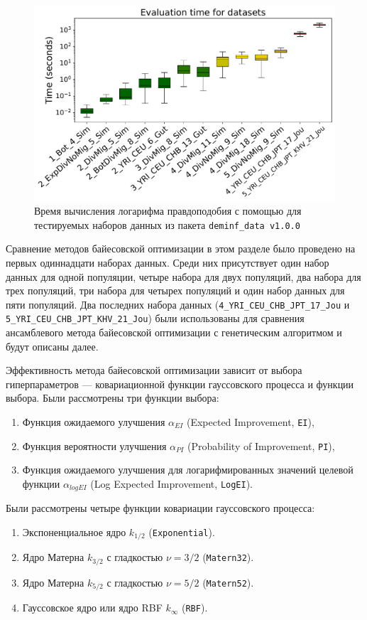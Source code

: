\begin{figure}[ht]
    \centering
    \includegraphics[width=\linewidth]{images_experiments/bo_hpo/eval_time_all_datasets.pdf}
    \caption{Время вычисления логарифма правдоподобия с помощью \moments для тестируемых наборов данных из пакета \texttt{deminf\_data v1.0.0}}
    \label{fig:part2:bo_hpo:eval_time_data_sets}
\end{figure}

Сравнение методов байесовской оптимизации в этом разделе было проведено на первых одиннадцати наборах данных.
Среди них присутствует один набор данных для одной популяции, четыре набора для двух популяций, два набора для трех популяций, три набора для четырех популяций и один набор данных для пяти популяций.
Два последних набора данных (\texttt{4\_YRI\_CEU\_CHB\_JPT\_17\_Jou} и \texttt{5\_YRI\_CEU\_CHB\_JPT\_KHV\_21\_Jou}) были использованы для сравнения ансамблевого метода байесовской оптимизации с генетическим алгоритмом и будут описаны далее.

Эффективность метода байесовской оптимизации зависит от выбора гиперпараметров --- ковариационной функции гауссовского процесса и функции выбора.
Были рассмотрены три функции выбора:
\begin{enumerate}
    \item Функция ожидаемого улучшения $\alpha_{EI}$ (Expected Improvement, \texttt{EI}),
    \item Функция вероятности улучшения $\alpha_{PI}$ (Probability of Improvement, \texttt{PI}),
    \item Функция ожидаемого улучшения для логарифмированных значений целевой функции $\alpha_{logEI}$ (Log Expected Improvement, \texttt{LogEI}).
\end{enumerate}
Были рассмотрены четыре функции ковариации гауссовского процесса:
\begin{enumerate}
    \item Экспоненциальное ядро $k_{1/2}$ (\texttt{Exponential}).
    \item Ядро Матерна $k_{3/2}$ с гладкостью $\nu=3/2$ (\texttt{Matern32}).
    \item Ядро Матерна $k_{5/2}$ с гладкостью $\nu=5/2$ (\texttt{Matern52}).
    \item Гауссовское ядро или ядро RBF $k_{\infty}$ (\texttt{RBF}).
\end{enumerate}

